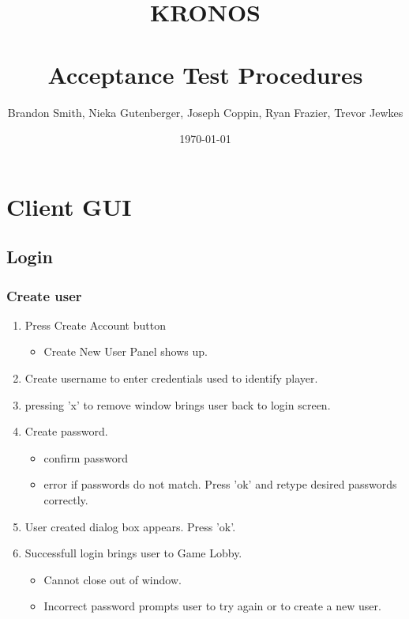 \documentclass[11pt, titlepage]{article}
\author{Brandon Smith, Nieka Gutenberger, Joseph Coppin, Ryan Frazier, Trevor Jewkes}
\title{KRONOS\\ \\
		 Acceptance Test Procedures}
\date{\today}
\begin{document}
\maketitle
\setcounter{tocdepth}{1}


\section{Client GUI}

\subsection{Login}
\subsubsection{Create user}
\begin{enumerate}

	\item Press Create Account button
		\begin{itemize}
	      \item Create New User Panel shows up.
			\end{itemize}
	\item Create username to enter credentials used to identify player.
	\item pressing 'x' to remove window brings user back to login screen.
	\item Create password.
		\begin{itemize}
	      \item confirm password
	      \item error if passwords do not match.  Press 'ok' and retype desired passwords correctly.
	  \end{itemize}

	\item User created dialog box appears.  Press 'ok'.
	\item Successfull login brings user to Game Lobby.
	      \begin{itemize}
	      	\item Cannot close out of window.
	      	\item Incorrect password prompts user to try again or to create a new user.
				\end{itemize}
\end{enumerate}
\end{document}
